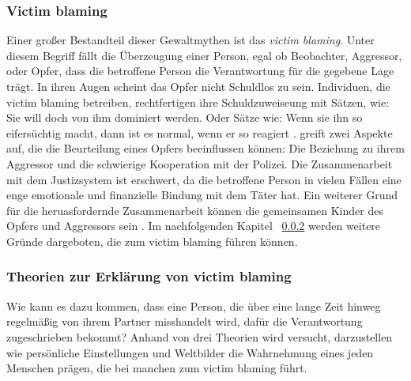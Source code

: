 \subsubsection{Victim blaming}     \label{2.1.3.1}
Einer großer Bestandteil dieser Gewaltmythen ist das \textit{victim blaming}. Unter diesem Begriff fällt die Überzeugung einer Person, egal ob Beobachter, Aggressor, oder Opfer, dass die betroffene Person die Verantwortung für die gegebene Lage trägt. In ihren Augen scheint das Opfer nicht Schuldlos zu sein. Individuen, die victim blaming betreiben, rechtfertigen ihre Schuldzuweiseung mit Sätzen, wie: Sie will doch von ihm dominiert werden. Oder Sätze wie: Wenn sie ihn so eifersüchtig macht, dann ist es normal, wenn er so reagiert \parencite{DVMAS_deutsch}. \textcite{victim_blaming} greift zwei Aspekte auf, die die Beurteilung eines Opfers beeinflussen können: Die Beziehung zu ihrem Aggressor und die schwierige Kooperation mit der Polizei. Die Zusammenarbeit mit dem Justizsystem ist erschwert, da die betroffene Person in vielen Fällen eine enge emotionale und finanzielle Bindung mit dem Täter hat. Ein weiterer Grund für die heruasfordernde Zusammenarbeit können die gemeinsamen Kinder des Opfers und Aggressors sein \parencite{victim_blaming}. Im nachfolgenden Kapitel ~\ref{2.1.3.2} werden weitere Gründe dargeboten, die zum victim blaming führen können.


\subsubsection{Theorien zur Erklärung von victim blaming}     \label{2.1.3.2}
Wie kann es dazu kommen, dass eine Person, die über eine lange Zeit hinweg regelmäßig von ihrem Partner misshandelt wird, dafür die Verantwortung zugeschrieben bekommt? Anhand von drei Theorien wird versucht, darzustellen wie persönliche Einstellungen und Weltbilder die Wahrnehmung eines jeden Menschen prägen, die bei manchen zum victim blaming führt.

